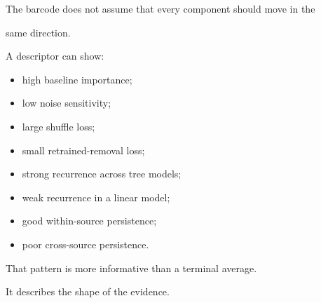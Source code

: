 \documentclass[11pt,a4paper,oneside]{report}
\begin{document}
The barcode does not assume that every component should move in the

same direction.



A descriptor can show:



\begin{itemize}



\item

high baseline importance;



\item

low noise sensitivity;



\item

large shuffle loss;



\item

small retrained-removal loss;



\item

strong recurrence across tree models;



\item

weak recurrence in a linear model;



\item

good within-source persistence;



\item

poor cross-source persistence.



\end{itemize}



That pattern is more informative than a terminal average.



It describes the shape of the evidence.
\end{document}
